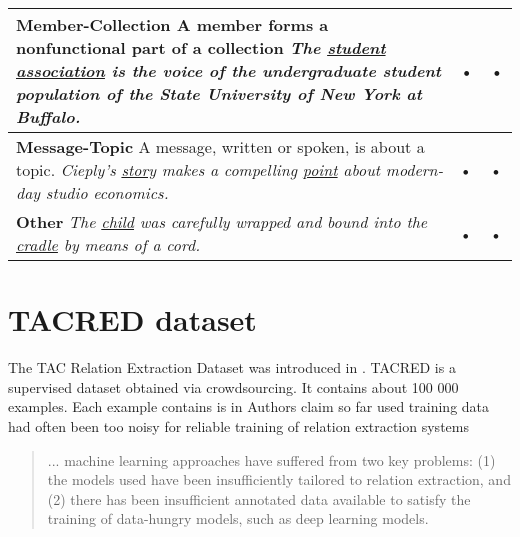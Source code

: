 \begin{tabular}{|p{10cm}|p{1cm}|p{1cm}|}
\hline 
\textbf{Member-Collection} \newline A member forms a nonfunctional part of a collection
\newline \textit{The \underline{student} \underline{association} is the voice of the undergraduate student population of the State University of New York at Buffalo.} & • & • \\ 
\hline 
\textbf{Message-Topic} \newline A message, written or spoken, is about a topic. 
\newline \textit{Cieply's \underline{story} makes a compelling \underline{point} about modern-day studio economics.} & • & • \\ 
\hline 
\textbf{Other} \newline 
\newline \textit{The \underline{child} was carefully wrapped and bound into the \underline{cradle} by means of a cord.} & • & • \\ 
\hline 
\end{tabular} 




\section{TACRED dataset}
The TAC Relation Extraction Dataset was introduced in \cite{zhang2017tacred}. TACRED is a supervised dataset obtained via crowdsourcing. It contains about 100 000 examples. Each example contains  is in  Authors claim so far used training data had often been too noisy for reliable training of relation extraction systems


\begin{quotation}
... machine learning approaches have suffered from two key problems: (1) the models used have been insufficiently tailored to relation extraction, and (2) there has been insufficient annotated data available to satisfy the training of data-hungry models, such as deep learning models.
\end{quotation} 